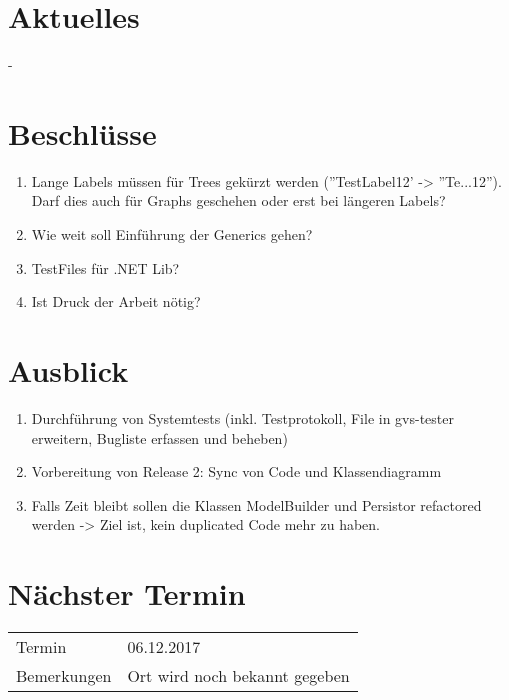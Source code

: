 \documentclass[11pt, a4paper,oneside]{scrartcl}
\begin{document}
	\section{Aktuelles}
	-
	
	\section{Beschlüsse}
	\begin{enumerate}
		\item Lange Labels müssen für Trees gekürzt werden (''TestLabel12' -> ''Te...12''). Darf dies auch für Graphs geschehen oder erst bei längeren Labels?
		\item Wie weit soll Einführung der Generics gehen?
		\item TestFiles für .NET Lib?
		\item Ist Druck der Arbeit nötig?
	\end{enumerate} 
	
	\section{Ausblick}
	\begin{enumerate}
		\item Durchführung von Systemtests (inkl. Testprotokoll, File in gvs-tester erweitern, Bugliste erfassen und beheben)
		\item Vorbereitung von Release 2: Sync von Code und Klassendiagramm
		\item Falls Zeit bleibt sollen die Klassen ModelBuilder und Persistor refactored werden -> Ziel ist, kein duplicated Code mehr zu haben.
	\end{enumerate}
	
	\section{Nächster Termin}
	\begin{tabu} to \linewidth {l X }
		\toprule
		Termin & 06.12.2017  \\
		Bemerkungen & Ort wird noch bekannt gegeben  \\
		\bottomrule
	\end{tabu}
	
\end{document}
